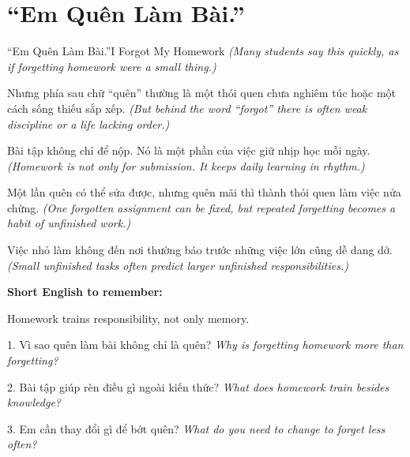 \section{``Em Quên Làm Bài.''}
\begin{truyen}{``Em Quên Làm Bài.''}{I Forgot My Homework}
\textit{(Many students say this quickly, as if forgetting homework were a small thing.)}

Nhưng phía sau chữ ``quên'' thường là một thói quen chưa nghiêm túc hoặc một cách sống thiếu sắp xếp.
\textit{(But behind the word ``forgot'' there is often weak discipline or a life lacking order.)}

Bài tập không chỉ để nộp. Nó là một phần của việc giữ nhịp học mỗi ngày.
\textit{(Homework is not only for submission. It keeps daily learning in rhythm.)}

Một lần quên có thể sửa được, nhưng quên mãi thì thành thói quen làm việc nửa chừng.
\textit{(One forgotten assignment can be fixed, but repeated forgetting becomes a habit of unfinished work.)}
\end{truyen}

\begin{baihoc}
Việc nhỏ làm không đến nơi thường báo trước những việc lớn cũng dễ dang dở.
\textit{(Small unfinished tasks often predict larger unfinished responsibilities.)}
\end{baihoc}

\begin{ghinhoanh}
\textbf{Short English to remember:}

Homework trains responsibility, not only memory.

\end{ghinhoanh}

\begin{tuhocnhanh}
1. Vì sao quên làm bài không chỉ là quên? \textit{Why is forgetting homework more than forgetting?}

2. Bài tập giúp rèn điều gì ngoài kiến thức? \textit{What does homework train besides knowledge?}

3. Em cần thay đổi gì để bớt quên? \textit{What do you need to change to forget less often?}
\end{tuhocnhanh}
\ngancach

